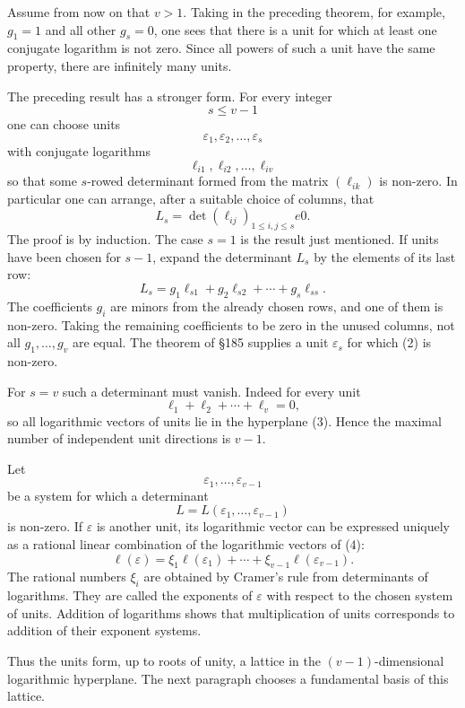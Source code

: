 \documentclass[12pt,a4paper]{article}
\begin{document}
Assume from now on that \(v>1\).  Taking in the preceding theorem, for example, \(g_1=1\) and all other \(g_s=0\), one sees that there is a unit for which at least one conjugate logarithm is not zero.  Since all powers of such a unit have the same property, there are infinitely many units.

The preceding result has a stronger form.  For every integer
\[
  s\le v-1
\]
one can choose units
\[
  \varepsilon_1,\varepsilon_2,
\ldots,\varepsilon_s
\]
with conjugate logarithms
\[
  \ell_{i1},\ell_{i2},\ldots,
\ell_{iv}
\]
so that some \(s\)-rowed determinant formed from the matrix \((\ell_{ik})\) is non-zero.  In particular one can arrange, after a suitable choice of columns, that
\[
  L_s=\det(\ell_{ij})_{1\le i,j\le s}
e0.
\tag{1}
\]
The proof is by induction.  The case \(s=1\) is the result just mentioned.  If units have been chosen for \(s-1\), expand the determinant \(L_s\) by the elements of its last row:
\[
  L_s=g_1\ell_{s1}+g_2\ell_{s2}+\cdots+g_s\ell_{ss}.
\tag{2}
\]
The coefficients \(g_i\) are minors from the already chosen rows, and one of them is non-zero.  Taking the remaining coefficients to be zero in the unused columns, not all \(g_1,
\ldots,g_v\) are equal.  The theorem of \S185 supplies a unit \(\varepsilon_s\) for which (2) is non-zero.

For \(s=v\) such a determinant must vanish.  Indeed for every unit
\[
  \ell_1+\ell_2+\cdots+\ell_v=0,
\tag{3}
\]
so all logarithmic vectors of units lie in the hyperplane (3).  Hence the maximal number of independent unit directions is \(v-1\).

Let
\[
  \varepsilon_1,
\ldots,
\varepsilon_{v-1}
\tag{4}
\]
be a system for which a determinant
\[
  L=L(\varepsilon_1,
\ldots,
\varepsilon_{v-1})
\tag{5}
\]
is non-zero.  If \(\varepsilon\) is another unit, its logarithmic vector can be expressed uniquely as a rational linear combination of the logarithmic vectors of (4):
\[
  \ell(\varepsilon)=\xi_1\ell(\varepsilon_1)+\cdots+\xi_{v-1}\ell(\varepsilon_{v-1}).
\tag{6}
\]
The rational numbers \(\xi_i\) are obtained by Cramer's rule from determinants of logarithms.  They are called the exponents of \(\varepsilon\) with respect to the chosen system of units.  Addition of logarithms shows that multiplication of units corresponds to addition of their exponent systems.

Thus the units form, up to roots of unity, a lattice in the \((v-1)\)-dimensional logarithmic hyperplane.  The next paragraph chooses a fundamental basis of this lattice.
\end{document}

